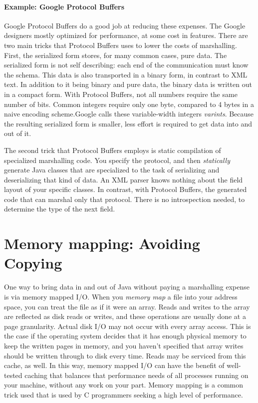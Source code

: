 \paragraph{Example: Google Protocol Buffers}
Google Protocol Buffers do a good job at reducing these expenses. The Google
designers mostly optimized for performance, at some cost in features. There are
two main tricks that Protocol Buffers uses to lower the costs of marshalling.
First, the serialized form stores, for many common cases, pure data. The
serialized form is not self describing: each end of the communication must know
the schema. This data is also transported in a binary form, in contrast to XML
text. In addition to it being binary and pure data, the binary data is written
out in a compact form. With Protocol Buffers, not all numbers require the same
number of bits. Common integers require only one byte, compared to 4 bytes in a
naive encoding scheme.Google calls these variable-width integers \emph{varints}.
Because the resulting serialized form is smaller, less effort is required to get
data into and out of it.

The second trick that Protocol Buffers employs is static compilation of
specialized marshalling code. You specify the protocol, and then
\emph{statically} generate Java classes that are specialized to the task of
serializing and deserializing that kind of data. An XML parser knows nothing
about the field layout of your specific classes. In contrast, with Protocol
Buffers, the generated code that can marshal only that protocol. There is no
introspection needed, to determine the type of the next field.


\section{Memory mapping: Avoiding Copying}
\label{sec:memory-mapping}

One way to bring data in and out of Java without paying a marshalling expense is
via memory mapped I/O. When you \emph{memory map} a file into your address
space, you can treat the file as if it were an array. Reads and writes to the
array are reflected as disk reads or writes, and these operations are usually
done at a page granularity. Actual disk I/O may not occur with every array
access. This is the case if the operating system decides that it has enough
physical memory to keep the written pages in memory, and you haven't specified
that array writes should be written through to disk every time. Reads may be
serviced from this cache, as well. In this way, memory mapped I/O can have the
benefit of well-tested caching that balances that performance needs of all
processes running on your machine, without any work on your part.  Memory
mapping is a common trick used that is used by C programmers seeking a high
level of performance.

